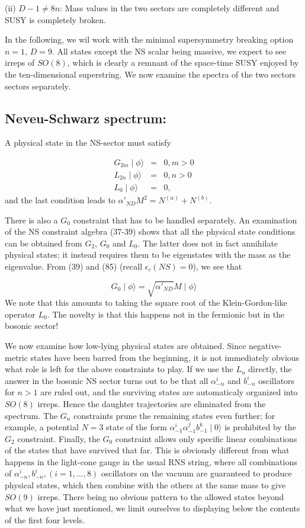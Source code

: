\documentclass[a4paper,a4paper]{article}
\begin{document}
(ii) $D-1 \neq 8n$:   Mass values in the two sectors are
completely different and SUSY is completely broken.


In the following, we wil work with the minimal supersymmetry breaking
option $n=1$, $D=9$. All states except the NS scalar being
massive, we expect to see irreps of $SO(8)$, which is clearly a
remnant of the space-time SUSY enjoyed by the ten-dimensional
superstring. We now examine the spectra of the two sectors sectors
separately.

\subsection{Neveu-Schwarz spectrum:}
A physical state in the NS-sector must satisfy

\begin{eqnarray}
G_{2m}\mid\phi\rangle&=&0,   m>0\\
L_{2n}\mid\phi\rangle&=&0,   n>0\\
L_{0}\mid\phi\rangle&=&0,
\end{eqnarray}
and the last condition leads to
$\alpha'_{ND}M^{2}=N^{(\alpha)}+N^{(b)}$.

There is also a  $G_0$ constraint that has to be handled
separately.  An examination of the NS constraint algebra (37-39)
shows that all the physical state conditions can be obtained from
$G_2$, $G_0$ and $L_0$. The latter does not in fact annihilate
physical states; it instead requires them to be eigenstates with
the mass as the eigenvalue.  From (39) and (85) (recall
$\epsilon_c (NS) = 0$), we see that

\begin{equation}
G_0 \mid\phi\rangle=\sqrt{ \alpha'_{ND}}M\mid\phi\rangle
\end{equation}
We note that this amounts to taking the square root of the
Klein-Gordon-like operator $L_0$.  The novelty is that this
happens not in the fermionic but in the bosonic sector!

We now examine how low-lying physical states are obtained.  Since
negative-metric states have been barred from the beginning, it is
not immediately obvious what role is left for the above
constraints to play.  If we use the $L_n$ directly, the answer in
the bosonic NS sector turns out to be that all $\alpha_{-n}^{i}$
and $b_{-n}^{i}$ oscillators for $n>1$ are ruled out, and the
surviving states are automaticaly organized into $SO(8)$ irreps.
Hence the daughter trajectories are eliminated from the spectrum.
The $G_n$ constraints prune the remaining states even further; for
example, a potential $N=3$ state of the form
$\alpha_{-1}^{i}\alpha_{-1}^{j}b_{-1}^{k}\mid0\rangle$ is
prohibited by the $G_{2}$ constraint. Finally, the $G_0$
constraint allows only specific linear combinations of the states
that have survived that far. This is obviously different from what
happens in the light-cone gauge in the usual RNS string, where all
combinations of $\alpha_{-n}^{i},b_{-n}^{i}, (i=1,...,8)$
oscillators on the vacuum are guaranteed to produce physical
states, which then combine with the others at the same mass to
give $SO(9)$ irreps.  There being no obvious pattern to the
allowed states beyond what we have just mentioned, we limit
ourselves to displaying below the contents of the first four
levels.
\end{document}
